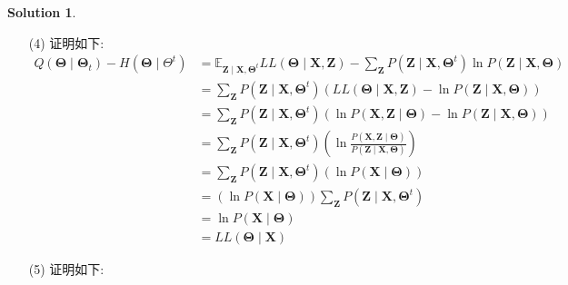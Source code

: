 \documentclass[a4paper,UTF8]{article}
\numberwithin{equation}{section}
\theoremstyle{definition}
\newtheorem*{solution}{Solution}
\begin{document}
\begin{solution}
\begin{enumerate}
        \item [(4)]
        证明如下:
        \begin{equation}
            \begin{aligned}
                Q\left(\boldsymbol{\Theta} \mid \boldsymbol{\Theta}_{t}\right)-H\left(\boldsymbol{\Theta} \mid \Theta^{t}\right) & = \mathbb{E}_{\boldsymbol{Z} \mid \boldsymbol{X}, \boldsymbol{\Theta}^{t}} L L(\boldsymbol{\Theta} \mid \boldsymbol{X}, \boldsymbol{Z})-\sum_{\boldsymbol{Z}} P\left(\boldsymbol{Z} \mid \boldsymbol{X}, \boldsymbol{\Theta}^{t}\right) \ln P(\boldsymbol{Z} \mid \boldsymbol{X}, \boldsymbol{\Theta}) \\
                & =\sum_{\boldsymbol{Z}} P\left(\boldsymbol{Z} \mid \boldsymbol{X}, \boldsymbol{\Theta}^{t}\right)(L L(\boldsymbol{\Theta} \mid \boldsymbol{X}, \boldsymbol{Z})-\ln P(\boldsymbol{Z} \mid \boldsymbol{X}, \boldsymbol{\Theta})) \\
                & =\sum_{\boldsymbol{Z}} P\left(\boldsymbol{Z} \mid \boldsymbol{X}, \boldsymbol{\Theta}^{t}\right)(\ln P(\boldsymbol{X}, \boldsymbol{Z} \mid \boldsymbol{\Theta})-\ln P(\boldsymbol{Z} \mid \boldsymbol{X}, \boldsymbol{\Theta})) \\
                &=\sum_{\boldsymbol{Z}} P\left(\boldsymbol{Z} \mid \boldsymbol{X}, \boldsymbol{\Theta}^{t}\right)\left(\ln \frac{P(\boldsymbol{X}, \boldsymbol{Z} \mid \boldsymbol{\Theta})}{P(\boldsymbol{Z} \mid \boldsymbol{X}, \boldsymbol{\Theta})}\right) \\
                &=\sum_{\boldsymbol{Z}} P\left(\boldsymbol{Z} \mid \boldsymbol{X}, \boldsymbol{\Theta}^{t}\right)(\ln P(\boldsymbol{X} \mid \boldsymbol{\Theta})) \\
                &=(\ln P(\boldsymbol{X} \mid \boldsymbol{\Theta})) \sum_{\boldsymbol{Z}} P\left(\boldsymbol{Z} \mid \boldsymbol{X}, \boldsymbol{\Theta}^{t}\right) \\
                &=\ln P(\boldsymbol{X} \mid \boldsymbol{\Theta}) \\
                &=L L(\boldsymbol{\Theta} \mid \boldsymbol{X})
                \end{aligned} \nonumber
        \end{equation}
        \item [(5)]
        证明如下:
        \begin{equation}

\end{equation}
\end{enumerate}
\end{solution}
\end{document}
